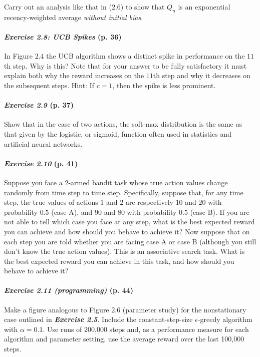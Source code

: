 \documentclass[10pt,a4paper]{article}
\begin{document}
Carry out an analysis like that in ($2.6$) to show that $Q_n$ is an exponential recency-weighted average \textit{without initial bias}.

\paragraph{\textit{Exercise 2.8: UCB Spikes} (p. 36)} In Figure $2.4$ the UCB algorithm shows a distinct spike
in performance on the $11$th step. Why is this? Note that for your answer to be fully satisfactory it must explain both why the reward increases on the $11$th step and why it decreases on the subsequent steps. Hint: If $c = 1$, then the spike is less prominent.

\paragraph{\textit{Exercise 2.9} (p. 37)} Show that in the case of two actions, the soft-max distribution is the same
as that given by the logistic, or sigmoid, function often used in statistics and artificial
neural networks.

\paragraph{\textit{Exercise 2.10} (p. 41)} Suppose you face a $2$-armed bandit task whose true action values change randomly from time step to time step. Specifically, suppose that, for any time step, the true values of actions $1$ and $2$ are respectively $10$ and $20$ with probability $0.5$ (case
A), and $90$ and $80$ with probability $0.5$ (case B). If you are not able to tell which case you face at any step, what is the best expected reward you can achieve and how should
you behave to achieve it? Now suppose that on each step you are told whether you are
facing case A or case B (although you still don't know the true action values). This is an associative search task. What is the best expected reward you can achieve in this task, and how should you behave to achieve it?

\paragraph{\textit{Exercise 2.11 (programming)} (p. 44)} Make a figure analogous to Figure $2.6$ (parameter study) for the nonstationary case outlined in \textbf{\textit{Exercise 2.5}}. Include the constant-step-size $\epsilon$-greedy algorithm with
$\alpha=0.1$. Use runs of 200,000 steps and, as a performance measure for each algorithm and parameter setting, use the average reward over the last 100,000 steps.
\end{document}
